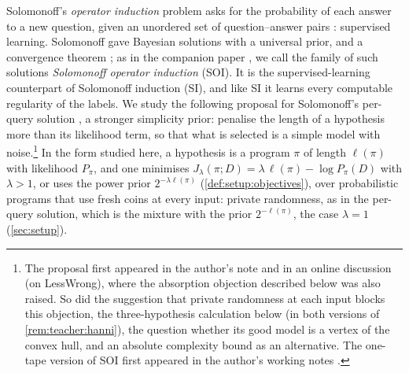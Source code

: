Solomonoff's \emph{operator induction} problem asks for the probability of each answer to a new question, given an unordered set of question--answer pairs \citep{solomonoff1999two,solomonoff2008three}: supervised learning. Solomonoff gave Bayesian solutions with a universal prior, and a convergence theorem \citep{solomonoff2008three}; as in the companion paper \citep{claudeSFI2026fundamentals}, we call the family of such solutions \emph{Solomonoff operator induction} (SOI). It is the supervised-learning counterpart of Solomonoff induction (SI), and like SI it learns every computable regularity of the labels. We study the following proposal for Solomonoff's per-query solution \citep[eq.~(10)]{solomonoff2008three}, a stronger simplicity prior: penalise the length of a hypothesis more than its likelihood term, so that what is selected is a simple model with noise.\footnote{The proposal first appeared in the author's note \citep{hanni2026grokking} and in an online discussion (on LessWrong), where the absorption objection described below was also raised. So did the suggestion that private randomness at each input blocks this objection, the three-hypothesis calculation below (in both versions of \cref{rem:teacher:hanni}), the question whether its good model is a vertex of the convex hull, and an absolute complexity bound as an alternative. The one-tape version of SOI first appeared in the author's working notes \citep{hanni2026notes}.} In the form studied here, a hypothesis is a program $\pi$ of length $\ell(\pi)$ with likelihood $P_\pi$, and one minimises $J_\lambda(\pi;D)=\lambda\,\ell(\pi)-\log P_\pi(D)$ with $\lambda>1$, or uses the power prior $2^{-\lambda\ell(\pi)}$ (\cref{def:setup:objectives}), over probabilistic programs that use fresh coins at every input: private randomness, as in the per-query solution, which is the mixture with the prior $2^{-\ell(\pi)}$, the case $\lambda=1$ (\cref{sec:setup}).

